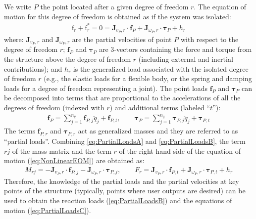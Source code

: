\documentclass[wes, manuscript]{copernicus}
\renewcommand{\v}[1]{\boldsymbol{#1}}
\newcommand{\m}[1]{\boldsymbol{#1}}
\newcommand{\kanef}{\mathrm{f}}
\begin{document}
We write $P$ the point located after a given degree of freedom $r$. The equation of motion for this degree of freedom is obtained as if the system was isolated:
\begin{align}
   \kanef_r + \kanef_r^* =  0 = \m{J}_{v_P,r} \cdot \v{f}_P + \m{J}_{\omega_P,r} \cdot \v{\tau}_P + h_{r}
    \label{eq:PartialLoadsA}
\end{align}
where: $\m{J}_{v_P,r}$ and $\m{J}_{\omega_P,r}$ are the partial velocities of point $P$ with respect to the degree of freedom $r$;  $\v{f}_P$ and $\v{\tau}_P$ are 3-vectors containing the force and torque from the structure above the degree of freedom $r$ (including external and inertial contributions); and $h_{r}$ is the generalized load associated with the isolated degree of freedom $r$ (e.g., the elastic loads for a flexible body, or the spring and damping loads for a degree of freedom representing a joint).  
The point loads $\v{f}_P$ and $\v{\tau}_P$ can be decomposed into terms that are proportional to the accelerations of all the degrees of freedom (indexed with $r$) and additional terms (labeled ``$t$''):
\begin{align}
\v{f}_P = \sum\limits_{j=1}^{n_q}     \v{f}_{P,j} \ddot{q}_j + \v{f}_{P,t}
    ,\qquad
\v{\tau}_P = \sum\limits_{j=1}^{n_q}  \v{\tau}_{P,j} \ddot{q}_j + \v{\tau}_{P,t}
    \label{eq:PartialLoadsB}
\end{align}
The terms $\v{f}_{P,r}$ and $\v{\tau}_{P,r}$ act as generalized masses and they are referred to as ``partial loads''. 
% 
Combining \autoref{eq:PartialLoadsA} and \autoref{eq:PartialLoadsB}, the term $rj$ of the mass matrix and the term $r$ of the right hand side of the equation of motion (\autoref{eq:NonLinearEOM}) are obtained as:
\begin{align}
  M_{rj} =
     - \m{J}_{v_P,r} \cdot \v{f}_{P,j}  
     - \m{J}_{\omega_P,r} \cdot \v{\tau}_{P,j}
      ,\qquad
    F_r =  \m{J}_{v_P,r}\cdot\v{f}_{P,t} + \m{J}_{\omega_P,r} \cdot \v{\tau}_{P,t} + h_{r}
      \label{eq:PartialLoadsC}
\end{align}
Therefore, the knowledge of the partial loads and the partial velocities at key points of the structure (typically, points where user outputs are desired) can be used to obtain the reaction loads (\autoref{eq:PartialLoadsB}) and the equations of motion (\autoref{eq:PartialLoadsC}).
\end{document}

